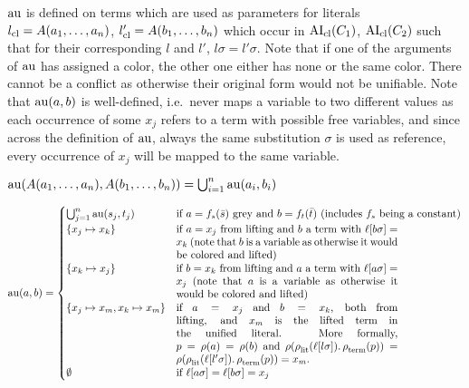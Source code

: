 \documentclass[,%
	paper=a4,%
	DIV15, 
	liststotoc,
	bibtotoc,
	draft=false,%
	numbers=noendperiod
]{scrartcl}
\begin{document}
\begin{enumerate}
		$\operatorname{au}$ is defined on terms which are used as parameters for literals $l_\mathrm{cl} = A(a_1, \dotsc, a_n)$, $l_\mathrm{cl}' = A(b_1, \dotsc, b_n)$ which occur in $\operatorname{AI}_\mathrm{cl}(C_1)$, $\operatorname{AI}_\mathrm{cl}(C_2)$ such that for their corresponding $l$ and $l'$, $l\sigma = l'\sigma$.
		Note that if one of the arguments of $\operatorname{au}$ has assigned a color, the other one either has none or the same color.
		There cannot be a conflict as otherwise their original form would not be unifiable.
		Note that $\operatorname{au}(a, b)$ is well-defined, i.e.~never maps a variable to two different values as each occurrence of some $x_j$ refers to a term with possible free variables, and since across the definition of $\operatorname{au}$, always the same substitution $\sigma$ is used as reference, every occurrence of $x_j$ will be mapped to the same variable.

		$\operatorname{au}(A(a_1, \dotsc, a_n), A(b_1, \dotsc, b_n)) = \bigcup_{i=1}^n \operatorname{au}(a_i, b_i)$

		$ \aiu (a, b) =
			\begin{cases}
				\bigcup_{j=1}^n \aiu(s_j, t_j) & \text{if $a=f_s(\bar s)$ grey and $b = f_t(\bar t)$ (includes $f_s$ being a constant)} \\
				\{x_j \mapsto x_k\} & \parbox[t]{.6\textwidth}{ if $a = x_j$ from lifting and $b$ a term with $\lifboth{b\sigma} = x_k$ (note that $b$ is a variable as otherwise it would be colored and lifted)} \\
			\{x_k \mapsto x_j\} & \parbox[t]{.6\textwidth}{  if $b = x_k$ from lifting and $a$ a term with $\lifboth{a\sigma} = x_j$ (note that $a$ is a variable as otherwise it would be colored and lifted)} \\
				\{x_j \mapsto x_m, x_k \mapsto x_m\} & \parbox[t]{.6\textwidth}{if $a = x_j$ and $b = x_k$, both from lifting, and $x_m$ is the lifted term in the unified literal. More formally, $p = \pos(a) = \pos(b)$ and $\pos(\poslit(\lifboth{l\sigma}).\posterm(p)) = \pos(\poslit(\lifboth{l'\sigma}).\posterm(p)) = x_m$.}\\
				\emptyset & \text{if $\lifboth{a\sigma} = \lifboth{b\sigma} = x_j$ }
			\end{cases} $


\end{enumerate}
\end{document}

